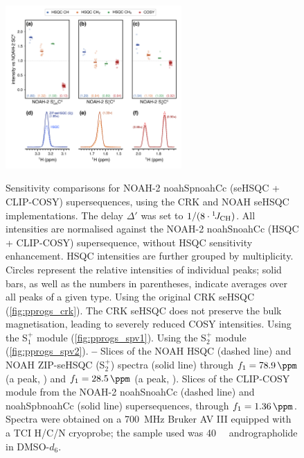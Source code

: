 \documentclass[11pt]{article}
\newcommand*{\noahtwo}[2]{\csname noah#1\endcsname\csname noah#2\endcsname}
\newcommand*{\noahSpa}{S$^+_1$}
\newcommand*{\noahSpb}{S$^+_2$}
\newcommand*{\onejch}{{}^{1}\!J_{\ce{CH}}}
\newcommand*{\andro}{Spectra were obtained on a \SI{700}{\MHz} Bruker AV III equipped with a TCI H/C/N cryoprobe; the sample used was \SI{40}{\milli\molar} andrographolide in DMSO-$d_6$.}
\begin{document}
\begin{figure}
    \centering
    \includegraphics[width=0.6\textwidth]{sehsqc_comp.png}
    {\label{fig:sehsqc_comp_crk}}
    {\label{fig:sehsqc_comp_spv1}}
    {\label{fig:sehsqc_comp_spv2}}
    {\label{fig:sehsqc_comp_ex_ch}}
    {\label{fig:sehsqc_comp_ex_ch2}}
    {\label{fig:sehsqc_comp_ex_cosy}}
    \caption{
        Sensitivity comparisons for NOAH-2 \noahtwo{Sp}{Cc} (seHSQC + CLIP-COSY) supersequences, using the CRK and NOAH seHSQC implementations.
        The delay $\Delta'$ was set to $1/(8\cdot\onejch)$.
        All intensities are normalised against the NOAH-2 \noahtwo{S}{Cc} (HSQC + CLIP-COSY) supersequence, without HSQC sensitivity enhancement.
        HSQC intensities are further grouped by multiplicity.
        Circles represent the relative intensities of individual peaks; solid bars, as well as the numbers in parentheses, indicate averages over all peaks of a given type.
        \textbf{} Using the original CRK seHSQC (\cref{fig:pprogs_crk}).
        The CRK seHSQC does not preserve the bulk magnetisation, leading to severely reduced COSY intensities.
        \textbf{} Using the \noahSpa{} module (\cref{fig:pprogs_spv1}).
        \textbf{} Using the \noahSpb{} module (\cref{fig:pprogs_spv2}).
        \textbf{--} Slices of the NOAH HSQC (dashed line) and NOAH ZIP-seHSQC (\noahSpb{}) spectra (solid line) through $f_1 = \SI{78.9}{\ppm}$ (a  peak, ) and $f_1 = \SI{28.5}{\ppm}$ (a  peak, ).
        \textbf{} Slices of the CLIP-COSY module from the NOAH-2 \noahtwo{S}{Cc} (dashed line) and \noahtwo{Spb}{Cc} (solid line) supersequences, through $f_1 = \SI{1.36}{\ppm}$.
        \andro{}
    }
    \label{fig:sehsqc_comp}
\end{figure}
\end{document}
